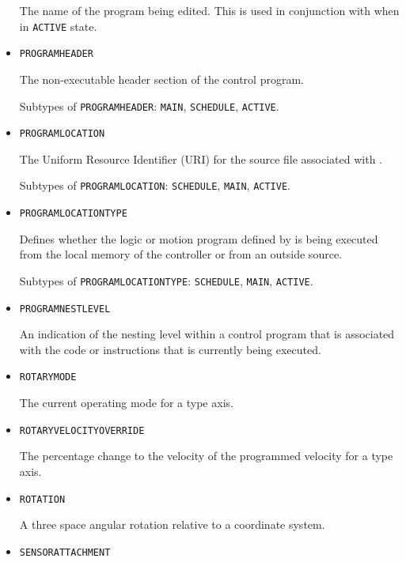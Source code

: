 \begin{itemize}
The name of the program being edited. 
 This is used in conjunction with  when in \texttt{ACTIVE} state. 


\item \texttt{PROGRAM\textunderscore HEADER}  

The non-executable header section of the control program.

Subtypes of \texttt{PROGRAM\textunderscore HEADER}: \texttt{MAIN}, \texttt{SCHEDULE}, \texttt{ACTIVE}.

\item \texttt{PROGRAM\textunderscore LOCATION}  

The Uniform Resource Identifier (URI) for the source file associated with .

Subtypes of \texttt{PROGRAM\textunderscore LOCATION}: \texttt{SCHEDULE}, \texttt{MAIN}, \texttt{ACTIVE}.

\item \texttt{PROGRAM\textunderscore LOCATION\textunderscore TYPE}  

Defines whether the logic or motion program defined by  is being executed from the local memory of the controller or from an outside source.

Subtypes of \texttt{PROGRAM\textunderscore LOCATION\textunderscore TYPE}: \texttt{SCHEDULE}, \texttt{MAIN}, \texttt{ACTIVE}.

\item \texttt{PROGRAM\textunderscore NEST\textunderscore LEVEL}  

An indication of the nesting level within a control program that is associated with the code or instructions that is currently being executed.


\item \texttt{ROTARY\textunderscore MODE}  

The current operating mode for a  type axis.


\item \texttt{ROTARY\textunderscore VELOCITY\textunderscore OVERRIDE}  

The percentage change to the velocity of the programmed velocity for a  type axis.


\item \texttt{ROTATION}  

A three space angular rotation relative to a coordinate system.


\item \texttt{SENSOR\textunderscore ATTACHMENT}  


\end{itemize}
